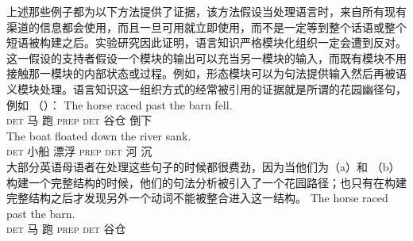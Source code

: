 上述那些例子都为以下方法提供了证据，该方法假设当处理语言时，来自所有现有渠道的信息都会使用，而且一旦可用就立即使用，而不是一定等到整个话语或整个短语被构建之后。实验研究因此证明，语言知识严格模块化组织一定会遭到反对。这一假设的支持者假设一个模块的输出可以充当另一模块的输入，而既有模块不用接触那一模块的内部状态或过程。例如，形态模块可以为句法提供输入然后再被语义模块处理。语言知识这一组织方式的经常被引用的证据就是所谓的花园幽径句，例如 （）：
\eal
\ex\label{bsp-horse-past-barn} 
\gll The horse raced past the barn fell.\\
    \textsc{det} 马 跑 \textsc{prep} \textsc{det} 谷仓 倒下\\
\ex 
\gll The boat floated down the river sank.\\
    \textsc{det} 小船 漂浮 \textsc{prep} \textsc{det} 河 沉\\
\zl
大部分英语母语者在处理这些句子的时候都很费劲，因为当他们为（a）和 （b）构建一个完整结构的时候，他们的句法分析被引入了一个花园路径；也只有在构建完整结构之后才发现另外一个动词不能被整合进入这一结构。
\eal
\ex 
\gll The horse raced past the barn.\\
    \textsc{det} 马 跑 \textsc{prep} \textsc{det} 谷仓\\

